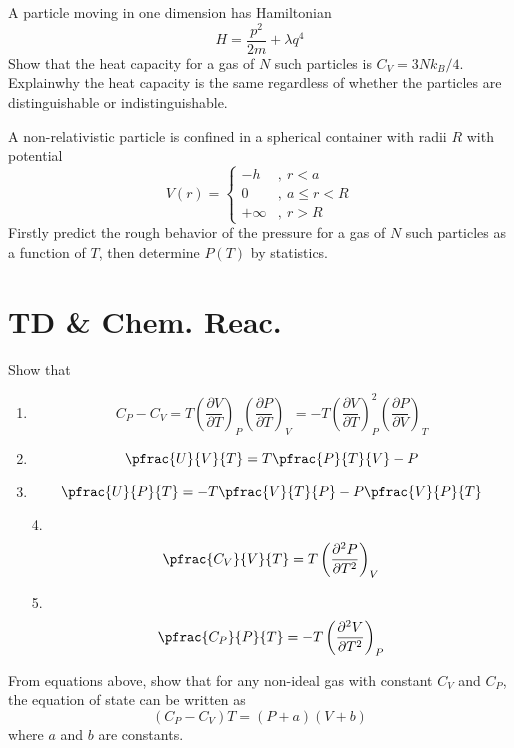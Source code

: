 \documentclass[CJK]{beamer}
\begin{document}
\begin{frame}
\bch
A particle moving in one dimension has Hamiltonian $$H=\frac{p^{2}}{2 m}+\lambda q^{4}$$ Show that the heat capacity for a gas of $N$ such particles is $C_V = 3Nk_B/4$. Explainwhy the heat capacity is the same regardless of whether the particles are distinguishable or indistinguishable.
\ech
\end{frame}

\begin{frame}
\bch
A non-relativistic particle is confined in a spherical container with radii $R$ with potential$$ V(r) = \begin{cases} -h&,\ r<a \\ 0 &,\ a\leq r <R \\ +\infty &,\ r>R\end{cases}$$
Firstly predict the rough behavior of the pressure for a gas of $N$ such particles as a function of $T$, then determine $P(T)$ by statistics.
\ech
\end{frame}

\section{TD \& Chem. Reac.}
\begin{frame}
\bch
Show that
\begin{enumerate}
\item $$C_P - C_V = T \left(\frac{\partial V}{\partial T}\right)_P \left(\frac{\partial P}{\partial T}\right)_V = - T \left( \frac{\partial V}{\partial T}\right)_P^2 \left( \frac{\partial P}{\partial V}\right)_T$$
\item $$\pfrac{U}{V}{T} = T \pfrac{P}{T}{V} - P$$
\item $$\pfrac{U}{P}{T} = -T \pfrac{V}{T}{P} - P \pfrac{V}{P}{T}$$
\end{enumerate}
\ech
\end{frame}


\begin{frame}
\bch
\begin{enumerate}
\item[4.] $$\pfrac{C_V}{V}{T} = T \left( \frac{\partial^2 P}{\partial T^2} \right)_V$$
\item[5.] $$\pfrac{C_P}{P}{T} = -T \left( \frac{\partial^2 V}{\partial T^2} \right)_P$$
\end{enumerate}
From equations above, show that for any non-ideal gas with constant $C_V$ and $C_P$, the equation of state can be written as $$ (C_P - C_V) T = (P+a)(V+b)$$ where $a$ and $b$ are constants.
\ech
\end{frame}
\end{document}
